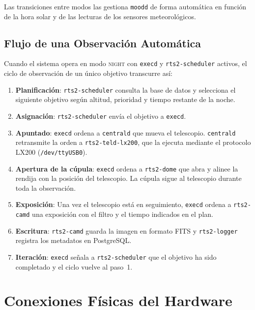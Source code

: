 \documentclass[12pt,a4paper,titlepage]{article}
\begin{document}
Las transiciones entre modos las gestiona \texttt{moodd} de forma automática en función de la hora solar y de las lecturas de los sensores meteorológicos.

\subsection{Flujo de una Observación Automática}
\label{sec:flujo}

Cuando el sistema opera en modo \textsc{night} con \texttt{execd} y \texttt{rts2-scheduler} activos, el ciclo de observación de un único objetivo transcurre así:

\begin{enumerate}
  \item \textbf{Planificación}: \texttt{rts2-scheduler} consulta la base de datos y selecciona el siguiente objetivo según altitud, prioridad y tiempo restante de la noche.
  \item \textbf{Asignación}: \texttt{rts2-scheduler} envía el objetivo a \texttt{execd}.
  \item \textbf{Apuntado}: \texttt{execd} ordena a \texttt{centrald} que mueva el telescopio. \texttt{centrald} retransmite la orden a \texttt{rts2-teld-lx200}, que la ejecuta mediante el protocolo LX200 (\texttt{/dev/ttyUSB0}).
  \item \textbf{Apertura de la cúpula}: \texttt{execd} ordena a \texttt{rts2-dome} que abra y alinee la rendija con la posición del telescopio. La cúpula sigue al telescopio durante toda la observación.
  \item \textbf{Exposición}: Una vez el telescopio está en seguimiento, \texttt{execd} ordena a \texttt{rts2-camd} una exposición con el filtro y el tiempo indicados en el plan.
  \item \textbf{Escritura}: \texttt{rts2-camd} guarda la imagen en formato FITS y \texttt{rts2-logger} registra los metadatos en PostgreSQL.
  \item \textbf{Iteración}: \texttt{execd} señala a \texttt{rts2-scheduler} que el objetivo ha sido completado y el ciclo vuelve al paso~1.
\end{enumerate}

\section{Conexiones Físicas del Hardware}
\end{document}
